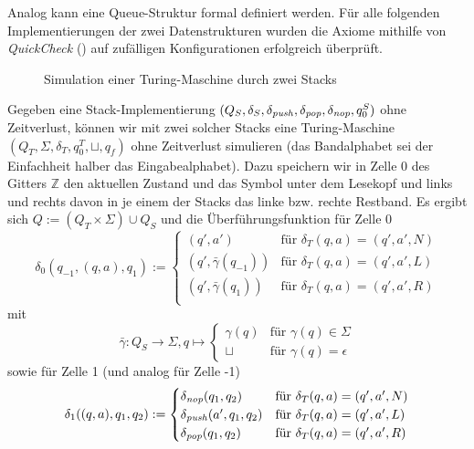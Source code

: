 \documentclass{article}
\begin{document}
Analog kann eine Queue-Struktur formal definiert werden. Für alle folgenden Implementierungen der zwei Datenstrukturen wurden die Axiome mithilfe von \emph{QuickCheck} (\cite{hughes00}) auf zufälligen Konfigurationen erfolgreich überprüft.

\begin{beispiel}
    \begin{figure}[h]
        \centering
        \caption{Simulation einer Turing-Maschine durch zwei Stacks}
    \end{figure}
    Gegeben eine Stack-Implementierung $(Q_S, \delta_S, \delta_{\mathit{push}}, \delta_{\mathit{pop}}, \delta_{\mathit{nop}}, q^S_0)$ ohne Zeitverlust, können wir mit zwei solcher Stacks eine Turing-Maschine $(Q_T, \Sigma, \delta_T, q^T_0, \sqcup, q_f)$ ohne Zeitverlust simulieren (das Bandalphabet sei der Einfachheit halber das Eingabealphabet). Dazu speichern wir in Zelle 0 des Gitters $\mathbb{Z}$ den aktuellen Zustand und das Symbol unter dem Lesekopf und links und rechts davon in je einem der Stacks das linke bzw. rechte Restband. Es ergibt sich $Q := (Q_T \times \Sigma) \cup Q_S$ und die Überführungsfunktion für Zelle 0
    \[ \delta_0(q_{-1}, (q, a), q_1) :=
        \begin{cases}
            (q', a') &\text{für } \delta_T(q, a) = (q', a', N) \\
            (q', \bar\gamma(q_{-1})) &\text{für } \delta_T(q, a) = (q', a', L) \\
            (q', \bar\gamma(q_1)) &\text{für } \delta_T(q, a) = (q', a', R) \\
    \end{cases} \]
    mit
    \[ \bar\gamma : Q_S \rightarrow \Sigma, q \mapsto \begin{cases}
            \gamma(q) &\text{für } \gamma(q) \in \Sigma \\
            \sqcup &\text{für } \gamma(q) = \epsilon
    \end{cases} \]
    sowie für Zelle 1 (und analog für Zelle -1)
    \[ \delta_1((q, a), q_1, q_2) :=
        \begin{cases}
            \delta_{\mathit{nop}}(q_1, q_2) &\text{für } \delta_T(q, a) = (q', a', N) \\
            \delta_{\mathit{push}}(a', q_1, q_2) &\text{für } \delta_T(q, a) = (q', a', L) \\
            \delta_{\mathit{pop}}(q_1, q_2) &\text{für } \delta_T(q, a) = (q', a', R) \\
    \end{cases} \]
\end{beispiel}
\end{document}
